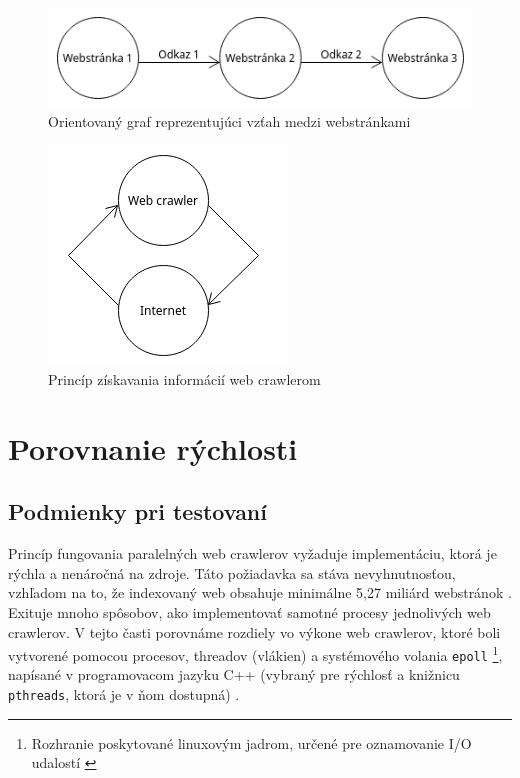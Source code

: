 \documentclass[10pt,twoside,slovak,a4paper]{article}
\begin{document}
\newpage

\begin{figure}
    \centering
    \includegraphics[width=\linewidth]{diagram1.png}
    \caption{Orientovaný graf reprezentujúci vzťah medzi webstránkami}
\end{figure}

\begin{figure}
    \centering
    \includegraphics[width=\linewidth]{diagram2.png}
    \caption{Princíp získavania informácií web crawlerom \cite{kausar2013web}}
\end{figure}

\section{Porovnanie rýchlosti}

\subsection{Podmienky pri testovaní}

Princíp fungovania paralelných web crawlerov vyžaduje implementáciu, ktorá je rýchla a nenáročná na zdroje. Táto požiadavka sa stáva nevyhnutnosťou, vzhľadom na to, že indexovaný web obsahuje minimálne 5,27 miliárd webstránok \cite{9648837}. Exituje mnoho spôsobov, ako implementovať samotné procesy jednolivých web crawlerov. V tejto časti porovnáme rozdiely vo výkone web crawlerov, ktoré boli vytvorené pomocou procesov, threadov (vlákien) a systémového volania \texttt{epoll} \footnote{Rozhranie poskytované linuxovým jadrom, určené pre oznamovanie I/O udalostí \cite{kerrisk2010linux}}, napísané v programovacom jazyku C++ (vybraný pre rýchlosť a knižnicu \texttt{pthreads}, ktorá je v ňom dostupná) \cite{9648837}.
\end{document}
